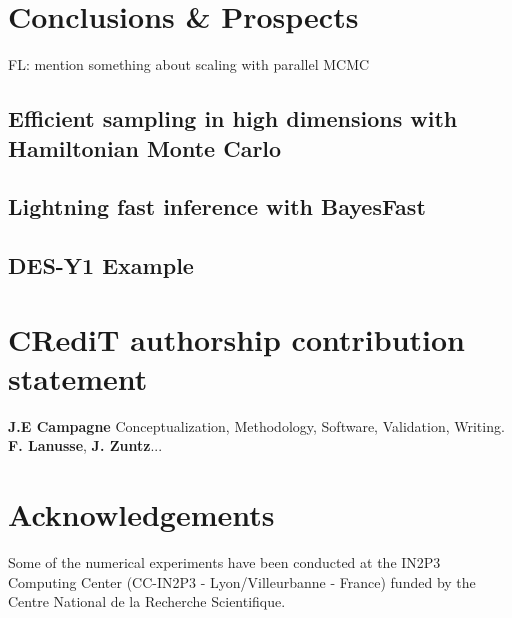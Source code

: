 \documentclass[twocolumn,twocolappendix,nofootinbib,iop]{openjournal}
\newcommand{\FrL}[1]{{\color{cyan}FL: #1}}
\begin{document}
\section{Conclusions \& Prospects}
\label{sec-conclusion}

\FrL{mention something about scaling with parallel MCMC}

\subsection{Efficient sampling in high dimensions with Hamiltonian Monte Carlo}



\subsection{Lightning fast inference with BayesFast}

%
%
\subsection{DES-Y1 Example}
%

\section*{CRediT authorship contribution statement}
\textbf{J.E Campagne} Conceptualization, Methodology, Software, Validation, Writing.
\textbf{F. Lanusse}, \textbf{J. Zuntz}...


\section*{Acknowledgements}
Some of the numerical experiments have been conducted at the IN2P3 Computing Center (CC-IN2P3 - Lyon/Villeurbanne - France) funded by the Centre National de la Recherche Scientifique.


\appendix
\end{document}
